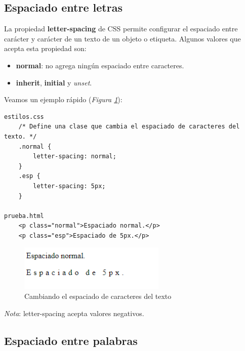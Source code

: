\subsection{Espaciado entre letras}

La propiedad \textbf{letter-spacing} de CSS permite configurar el espaciado entre carácter y carácter de un texto de un objeto o etiqueta. Algunos valores que acepta esta propiedad son:
\begin{itemize}
    \item \textbf{normal}: no agrega ningún espaciado entre caracteres.
    \item \textbf{inherit}, \textbf{initial} y \textit{unset}.
\end{itemize}

Veamos un ejemplo rápido (\textit{Figura \ref{fig: 16}}):
\begin{lstlisting}
estilos.css
    /* Define una clase que cambia el espaciado de caracteres del texto. */
    .normal {
        letter-spacing: normal;
    }
    .esp {
        letter-spacing: 5px;
    }
        
prueba.html
    <p class="normal">Espaciado normal.</p>
    <p class="esp">Espaciado de 5px.</p>
\end{lstlisting}
\begin{figure}[H]
    \centering
    \caption{Cambiando el espaciado de caracteres del texto}
    \label{fig: 16}
    \includegraphics[width=7cm]{ss/fuentes-spacing.png}
\end{figure}

\textit{Nota}: letter-spacing acepta valores negativos.


\subsection{Espaciado entre palabras}

